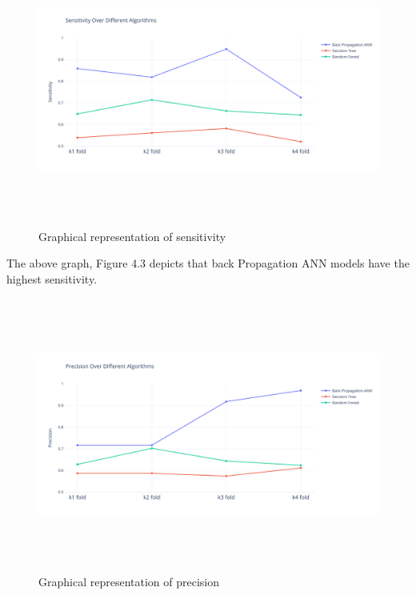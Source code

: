 \begin{figure}[H]
\begin{center}
\includegraphics[width=150mm,height=90mm]{comparisonnew/sensitivity.png}
 \caption{Graphical representation of sensitivity}
 \end{center}                
\end{figure}
The   above   graph, Figure 4.3 depicts  that    back Propagation ANN  models  have the highest sensitivity.

\begin{figure}[H]
\begin{center}
\includegraphics[width=150mm,height=90mm]{comparisonnew/precision.png}
 \caption{Graphical representation of precision}
 \end{center}                
\end{figure}

